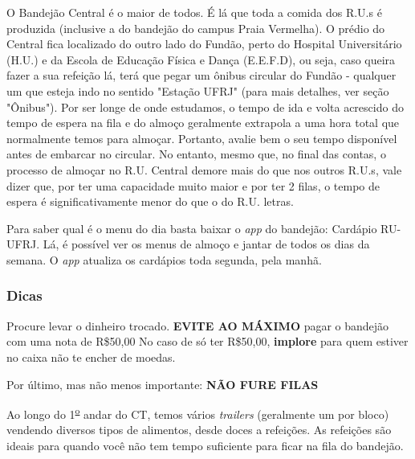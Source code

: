     O Bandejão Central é o maior de todos. É lá que toda a comida dos R.U.s é produzida (inclusive a do bandejão do campus Praia Vermelha). O prédio do Central fica localizado do outro lado do Fundão, perto do Hospital Universitário (H.U.) e da Escola de Educação Física e Dança (E.E.F.D), ou seja, caso queira fazer a sua refeição lá, terá que pegar um ônibus circular do Fundão - qualquer um que esteja indo no sentido "Estação UFRJ" (para mais detalhes, ver seção "Ônibus"). Por ser longe de onde estudamos, o tempo de ida e volta acrescido do tempo de espera na fila e do almoço geralmente extrapola a uma hora total que normalmente temos para almoçar. Portanto, avalie bem o seu tempo disponível antes de embarcar no circular. No entanto, mesmo que, no final das contas, o processo de almoçar no R.U. Central demore mais do que nos outros R.U.s, vale dizer que, por ter uma capacidade muito maior e por ter 2 filas, o tempo de espera é significativamente menor do que o do R.U. letras.
    
    Para saber qual é o menu do dia basta baixar o \textit{app} do bandejão: Cardápio RU-UFRJ. Lá, é possível ver os menus de almoço e jantar de todos os dias da semana. O \textit{app} atualiza os cardápios toda segunda, pela manhã.
    
    \subsubsection {Dicas}
    Procure levar o dinheiro trocado. \textbf{EVITE AO MÁXIMO} pagar o bandejão com uma nota de R\$50,00
    No caso de só ter R\$50,00, \textbf{implore} para quem estiver no caixa não te encher de moedas.
    
    Por último, mas não menos importante: \textbf{NÃO FURE FILAS}
    
    \newpage
    Ao longo do 1\textsuperscript{\underline{o}} andar do CT, temos vários \textit{trailers} (geralmente um por bloco) vendendo diversos tipos de alimentos, desde doces a refeições. As refeições são ideais para quando você não tem tempo suficiente para ficar na fila do bandejão.
    
